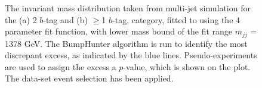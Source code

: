 \begin{figure}[!ht]
  \begin{center}
    \captionsetup[subfigure]{aboveskip=0pt,justification=centering}
  \end{center}
  \caption{ The invariant mass distribution taken from multi-jet simulation for the (a) 2 $b$-tag and (b) $\geq$1 $b$-tag,
    category, fitted to using the 4 parameter fit function, with lower mass bound of the fit range $m_{jj}$ = 1378 GeV.
    The BumpHunter algorithm is run to identify the most discrepant excess, as indicated by the blue lines.
    Pseudo-experiments are used to assign the excess a $p$-value, which is shown on the plot. 
    The \summer{} data-set event selection has been applied.}
  \label{fig:Short_4para_1378_figure1}
\end{figure}


